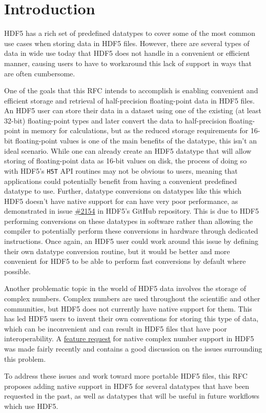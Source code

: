 \documentclass[../HDF5_RFC.tex]{subfiles}
\begin{document}
\section{Introduction}
\label{intro}

HDF5 has a rich set of predefined datatypes to cover some of the most common use cases when
storing data in HDF5 files. However, there are several types of data in wide use today that
HDF5 does not handle in a convenient or efficient manner, causing users to have to workaround
this lack of support in ways that are often cumbersome.

One of the goals that this RFC intends to accomplish is enabling convenient and efficient
storage and retrieval of half-precision floating-point data in HDF5 files. An HDF5 user can
store their data in a dataset using one of the existing (at least 32-bit) floating-point
types and later convert the data to half-precision floating-point in memory for calculations,
but as the reduced storage requirements for 16-bit floating-point values is one of the main
benefits of the datatype, this isn't an ideal scenario. While one can already create an HDF5
datatype that will allow storing of floating-point data as 16-bit values on disk, the process
of doing so with HDF5's \texttt{H5T} API routines may not be obvious to users, meaning that
applications could potentially benefit from having a convenient predefined datatype to use.
Further, datatype conversions on datatypes like this which HDF5 doesn't have native support
for can have very poor performance, as demonstrated in issue \href{https://github.com/HDFGroup/hdf5/issues/2154}{\#2154}
in HDF5's GitHub repository. This is due to HDF5 performing conversions on these datatypes
in software rather than allowing the compiler to potentially perform these conversions in
hardware through dedicated instructions. Once again, an HDF5 user could work around this issue
by defining their own datatype conversion routine, but it would be better and more convenient
for HDF5 to be able to perform fast conversions by default where possible.

Another problematic topic in the world of HDF5 data involves the storage of complex numbers.
Complex numbers are used throughout the scientific and other communities, but HDF5 does not
currently have native support for them. This has led HDF5 users to invent their own conventions
for storing this type of data, which can be inconvenient and can result in HDF5 files that have
poor interoperability. A \href{https://github.com/HDFGroup/hdf5/discussions/3339}{feature request}
for native complex number support in HDF5 was made fairly recently and contains a good discussion
on the issues surrounding this problem.

To address these issues and work toward more portable HDF5 files, this RFC proposes adding native
support in HDF5 for several datatypes that have been requested in the past, as well as datatypes
that will be useful in future workflows which use HDF5.
\end{document}
